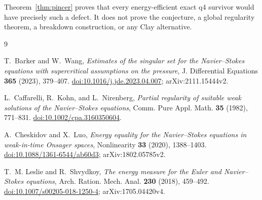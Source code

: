 \documentclass[11pt]{article}
\theoremstyle{remark}
\begin{document}
Theorem~\ref{thm:pincer} proves that every energy-efficient exact q4
survivor would have precisely such a defect.  It does not prove the
conjecture, a global regularity theorem, a breakdown construction, or
any Clay alternative.

\begin{thebibliography}{9}
\raggedright

T.~Barker and W.~Wang,
\emph{Estimates of the singular set for the Navier--Stokes equations
with supercritical assumptions on the pressure},
J. Differential Equations \textbf{365} (2023), 379--407.
\href{https://doi.org/10.1016/j.jde.2023.04.007}
{doi:10.1016/j.jde.2023.04.007};
arXiv:2111.15444v2.

L.~Caffarelli, R.~Kohn, and L.~Nirenberg,
\emph{Partial regularity of suitable weak solutions of the
Navier--Stokes equations},
Comm. Pure Appl. Math. \textbf{35} (1982), 771--831.
\href{https://doi.org/10.1002/cpa.3160350604}
{doi:10.1002/cpa.3160350604}.

A.~Cheskidov and X.~Luo,
\emph{Energy equality for the Navier--Stokes equations in weak-in-time
Onsager spaces},
Nonlinearity \textbf{33} (2020), 1388--1403.
\href{https://doi.org/10.1088/1361-6544/ab60d3}
{doi:10.1088/1361-6544/ab60d3};
arXiv:1802.05785v2.

T.~M. Leslie and R.~Shvydkoy,
\emph{The energy measure for the Euler and Navier--Stokes equations},
Arch. Ration. Mech. Anal. \textbf{230} (2018), 459--492.
\href{https://doi.org/10.1007/s00205-018-1250-4}
{doi:10.1007/s00205-018-1250-4};
arXiv:1705.04420v4.

\end{thebibliography}
\end{document}
